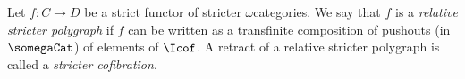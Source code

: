 \begin{dfn} 
    Let \( f \colon C \to D \) be a strict functor of stricter \( \omega \)\nbd categories.
    We say that \( f \) is a \emph{relative stricter polygraph} if \( f \) can be written as a transfinite composition of pushouts (in \( \somegaCat \)) of elements of \( \Icof \).
    A retract of a relative stricter polygraph is called a \emph{stricter cofibration}.
\end{dfn}






